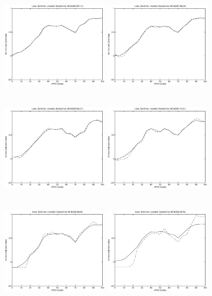 \documentclass[12pt]{article}
\begin{document}
\begin{figure}[p]
	\includegraphics[height=4.5cm,width=4.5cm]{kochplot3.eps}
	\includegraphics[height=4.5cm,width=4.5cm]{kochplot5.eps}
	\includegraphics[height=4.5cm,width=4.5cm]{kochplot7.eps}
	\includegraphics[height=4.5cm,width=4.5cm]{kochplot9.eps}
	\includegraphics[height=4.5cm,width=4.5cm]{kochplot11.eps}
	\includegraphics[height=4.5cm,width=4.5cm]{kochplot13.eps}
	

\end{figure}
\end{document}
